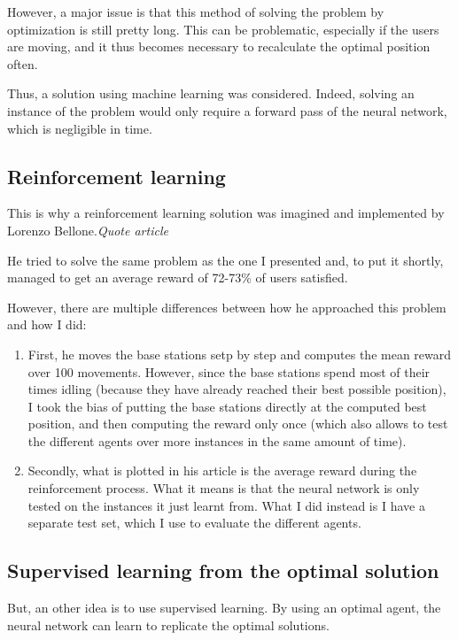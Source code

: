 \documentclass[letterpaper]{article}
\begin{document}
However, a major issue is that this method of solving the problem by optimization is still pretty long.
This can be problematic, especially if the users are moving, and it thus becomes necessary to recalculate the optimal position often.

Thus, a solution using machine learning was considered.
Indeed, solving an instance of the problem would only require a forward pass of the neural network, which is negligible in time.

\subsection{Reinforcement learning}

This is why a reinforcement learning solution was imagined and implemented by Lorenzo Bellone.\textit{Quote article}

He tried to solve the same problem as the one I presented and, to put it shortly, managed to get an average reward of 72-73\% of users satisfied.

However, there are multiple differences between how he approached this problem and how I did:

\begin{enumerate}
    \item First, he moves the base stations setp by step and computes the mean reward over 100 movements.
          However, since the base stations spend most of their times idling (because they have already reached their best possible position),
          I took the bias of putting the base stations directly at the computed best position, and then computing the reward only once (which also allows to test the different agents over more instances in the same amount of time).
    \item Secondly, what is plotted in his article is the average reward during the reinforcement process.
          What it means is that the neural network is only tested on the instances it just learnt from.
          What I did instead is I have a separate test set, which I use to evaluate the different agents.
\end{enumerate}

\subsection{Supervised learning from the optimal solution}

But, an other idea is to use supervised learning.
By using an optimal agent, the neural network can learn to replicate the optimal solutions.
\end{document}
